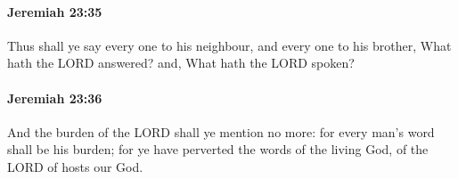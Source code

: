 		\paragraph{Jeremiah 23:35} %
			\label{JEREMIAH-23-35}

			Thus shall ye say every one to his neighbour, and every one to his brother, What hath the LORD answered? and, What hath the LORD spoken?


		\paragraph{Jeremiah 23:36} %
			\label{JEREMIAH-23-36}

			And the burden of the LORD shall ye mention no more: for every man’s word shall be his burden; for ye have perverted the words of the living God, of the LORD of hosts our God.


